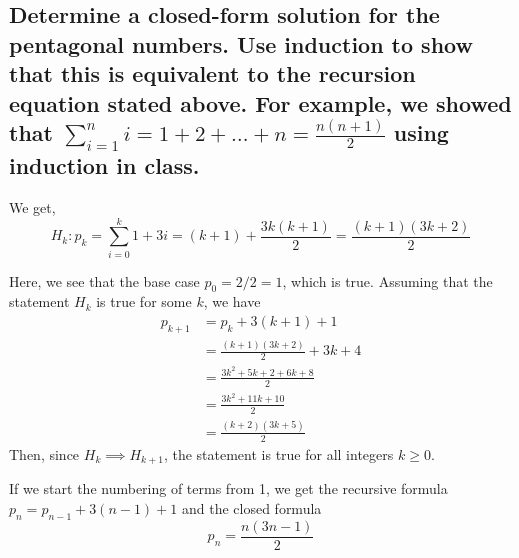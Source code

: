 \begin{parts}
    \part{
        Determine a closed-form solution for the pentagonal
        numbers.  Use induction to show that this is
        equivalent to the recursion equation stated above.
        For example, we showed that
        $\sum_{i=1}^n i=1+2+\ldots +n=\frac{n(n+1)}{2}$
        using induction in class.
    }
    \begin{solution}
        We get, 
        \begin{equation}
            H_k: p_k = \sum_{i=0}^k{1+3i} = (k+1)+\frac
            {3k(k+1)}{2}=\frac{(k+1)(3k+2)}{2}
        \end{equation}

        Here, we see that the base case $p_0=2/2=1$, which
        is true. Assuming that the statement $H_k$ is true
        for some $k$, we 
        have
        \begin{align*}
            p_{k+1} &= p_k+3(k+1)+1\\
            &=\frac{(k+1)(3k+2)}{2} +3k+4\\
            &=\frac{3k^2+5k+2+6k+8}{2}\\
            &=\frac{3k^2+11k+10}{2}\\
            &=\frac{(k+2)(3k+5)}{2}
        \end{align*}
        Then, since $H_k\implies H_{k+1}$, the statement is
        true for all integers $k\ge 0$.
        \begin{note}
            If we start the numbering of terms from 1, 
            we get the recursive formula $p_n=p_{n-1}+3(n-1)+1$ 
            and the closed formula 
            $$p_n=\frac{n(3n-1)}{2}$$
        \end{note}
    \end{solution}
\end{parts}